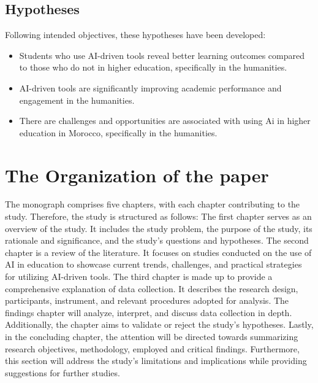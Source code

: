 \subsection{Hypotheses}\label{subsec:hypotheses}
\justifying
Following intended objectives, these hypotheses have been developed:
\begin{itemize}
      \item Students who use AI-driven tools reveal better learning outcomes
            compared to those who do not in higher education, specifically in the humanities.
      \item AI-driven tools are significantly improving academic
            performance and engagement in the humanities.
      \item There are challenges and opportunities are associated with using Ai in higher
            education in Morocco, specifically in the humanities.
\end{itemize}



\section{The Organization of the paper}\label{sec:the-organization-of-the-paper}
\justifying
The monograph comprises five chapters, with each chapter contributing to the study.
Therefore, the study is structured as follows: The first chapter serves as an overview of the study.
It includes the study problem, the purpose of the study, its rationale and significance, and the study's questions and hypotheses.
The second chapter is a review of the literature.
It focuses on studies conducted on the use of AI in education to showcase current trends, challenges, and practical strategies for utilizing AI-driven tools.
The third chapter is made up to provide a comprehensive explanation of data collection.
It describes the research design, participants,  instrument, and relevant procedures adopted for analysis.
The findings chapter will analyze, interpret, and discuss data collection in depth.
Additionally, the chapter aims to validate or reject the study's hypotheses.
Lastly, in the concluding chapter, the attention will be directed towards summarizing research objectives, methodology, employed and critical findings.
Furthermore, this section will address the study's limitations and implications while providing suggestions for further studies.



